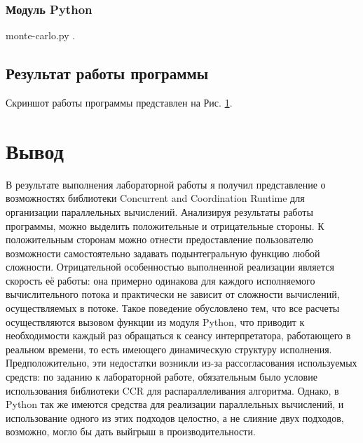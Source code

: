 \documentclass[russian,utf8,pointsection]{eskdtext}
\begin{document}
  \subsubsection{Модуль Python}
  
   {monte-carlo.py}
   .
       	
       	\subsection{Результат работы программы}
       	Скриншот работы программы представлен на Рис. \ref{ris:1_2}.
       	\begin{figure}[!h]
       		\caption{}
       		\label{ris:1_2}
       	\end{figure}  
       	
       	
       	     	

    \newpage    	   	
	\section{Вывод}
	В результате выполнения лабораторной работы я получил представление о возможностях библиотеки Concurrent and Coordination Runtime для организации параллельных вычислений.
	Анализируя результаты работы программы, можно выделить положительные и отрицательные стороны.
	К положительным сторонам можно отнести предоставление пользователю возможности самостоятельно задавать подынтегральную функцию любой сложности. Отрицательной особенностью выполненной реализации является скорость её работы: она примерно одинакова для каждого исполняемого вычислительного потока и практически не зависит от сложности вычислений, осуществляемых в потоке. Такое поведение обусловлено тем, что все расчеты осуществляются вызовом функции из модуля Python, что приводит к необходимости каждый раз обращаться к сеансу интерпретатора, работающего в реальном времени, то есть имеющего динамическую структуру исполнения.
	Предположительно, эти недостатки возникли из-за рассогласования используемых средств: по заданию к лабораторной работе, обязательным было условие использования библиотеки CCR для распараллеливания алгоритма. Однако, в Python так же имеются средства для реализации параллельных вычислений, и использование одного из этих подходов целостно, а не слияние двух подходов, возможно, могло бы дать выйгрыш в производительности.
		
\end{document}
